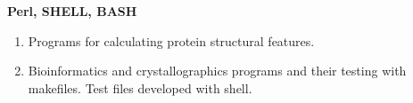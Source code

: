 \documentclass[a4paper,12pt]{article}
\begin{document}
\textbf{Perl, SHELL, BASH }

\begin{enumerate}
	\item Programs for calculating protein structural features.
	\item Bioinformatics and crystallographics programs and their testing with makefiles. Test files developed with shell.
\end{enumerate}
\end{document}
